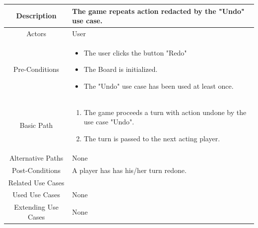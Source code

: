 \documentclass[10pt, a4paper]{article}
\begin{document}
	\begin{center}
		\begin{tabular}{ |c|p{10cm}| } 
			\hline
			Description & The game repeats action redacted by the "Undo" use case. \\
			\hline 
			Actors & User \\
			\hline  
			Pre-Conditions & \begin{itemize}[noitemsep,topsep=0pt]
				\item The user clicks the button "Redo"
				\item The Board is initialized.
				\item The "Undo" use case has been used at least once.
			\end{itemize} \\
			\hline  
			Basic Path & 
			\begin{enumerate}
				\item The game proceeds a turn with action undone by the use case "Undo".
				\item The turn is passed to the next acting player.
			\end{enumerate}\\
			\hline
			Alternative Paths & None \\
			\hline
			Post-Conditions & A player has has his/her turn redone.\\
			\hline 
			Related Use Cases & \\
			\hline 
			Used Use Cases & None\\
			\hline 
			Extending Use Cases & None \\
			\hline 
		\end{tabular}
	\end{center}
	
	\newpage
	
\end{document}
